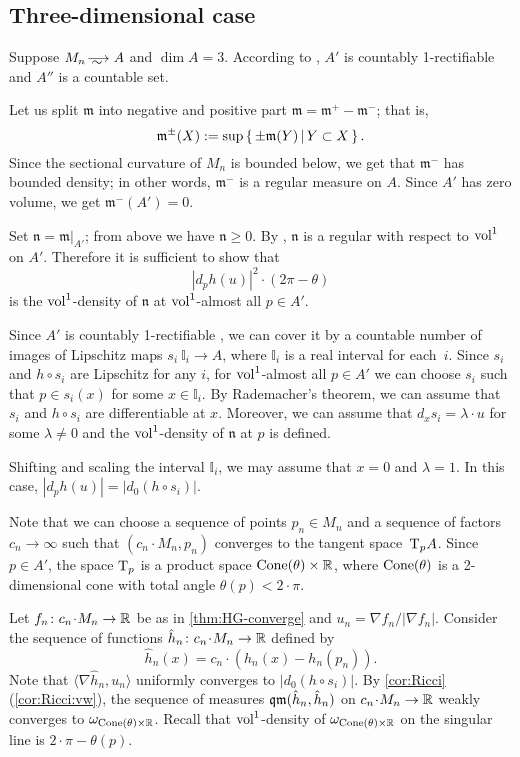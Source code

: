 \subsection{Three-dimensional case}


Suppose $M_n\smooths{}A$ and $\dim A=3$.
According to \cite{li-naber}, $A'$ is countably 1-rectifiable and $A''$ is a countable set. 

Let us split $\mathfrak m$ into negative and positive part $\mathfrak m=\mathfrak m^+-\mathfrak m^-$; that is,
\[\mathfrak m^\pm(X)\mathrel{{:}{=}}\sup\left\{\,\pm\mathfrak m(Y)\,\middle|\,Y\subset X\,\right\}.\]
Since the sectional curvature of $M_n$ is bounded below, we get that $\mathfrak m^-$ has bounded density; in other words, $\mathfrak m^-$ is a regular measure on $A$.
Since $A'$ has zero volume, we get $\mathfrak m^-(A')=0$.

Set $\mathfrak n=\mathfrak m|_{A'}$; from above we have $\mathfrak n\ge 0$.
By \cite{petrunin-SC}, $\mathfrak n$ is a regular with respect to $\operatorname{vol}^1$ on $A'$.
Therefore it is sufficient to show that 
\[|d_ph(u)|^2\cdot (2\pi-\theta)\]
is the $\operatorname{vol}^1$-density of $\mathfrak n$
at $\operatorname{vol}^1$-almost all $p\in A'$.

Since $A'$ is countably 1-rectifiable \cite{li-naber}, we can cover it by a countable number of images of Lipschitz maps $s_i\:\mathbb{I}_i\to A$, where $\mathbb{I}_i$ is a real interval for each~$i$.
Since $s_i$ and $h\circ s_i$ are Lipschitz for any $i$, for $\operatorname{vol}^1$-almost all $p\in A'$ we can choose $s_i$ such that $p\in s_i(x)$ for some $x\in \mathbb{I}_i$.
By Rademacher's theorem, we can assume that $s_i$ and $h\circ s_i$ are differentiable at $x$.
Moreover, we can assume that $d_xs_i=\lambda\cdot u$ for some $\lambda\ne 0$ and the $\operatorname{vol}^1$-density of $\mathfrak n$ at $p$ is defined.

Shifting and scaling the interval $\mathbb{I}_i$, we may assume that $x=0$ and $\lambda=1$.
In this case, $|d_ph(u)|=|d_0(h\circ s_i)|$.

Note that we can choose a sequence of points $p_n\in M_n$ and a sequence of factors $c_n\to \infty$ such that $(c_n\cdot M_n,p_n)$ converges to the tangent space~$\mathrm{T}_pA$.
Since $p\in A'$, the space $\mathrm{T}_p$ is a product space $\operatorname{Cone}(\theta)\times\mathbb{R}$, where $\operatorname{Cone}(\theta)$ is a 2-dimensional cone with total angle $\theta(p)<2\cdot\pi$.

Let $f_n\:c_n\cdot M_n\to \RR$ be as in \ref{thm:HG-converge} and $u_n=\nabla f_n/|\nabla f_n|$.
Consider the sequence of functions $\hat h_n\:c_n\cdot M_n\to \RR$ defined by 
\[\hat h_n(x)=c_n\cdot(h_n(x)-h_n(p_n)).\]
Note that $\langle\nabla \hat h_n,u_n\rangle$ uniformly converges to  $|d_0(h\circ s_i)|$.
By \ref{cor:Ricci}(\ref{cor:Ricci:vw}), the sequence of measures $\operatorname{\mathfrak{qm}}(\hat h_n, \hat h_n)$ on $c_n\cdot M_n\to \RR$ weakly converges to $\omega_{\operatorname{Cone}(\theta)\times\mathbb{R}}$.
Recall that $\operatorname{vol}^1$-density of $\omega_{\operatorname{Cone}(\theta)\times\mathbb{R}}$ on the singular line is $2\cdot \pi-\theta(p)$.

